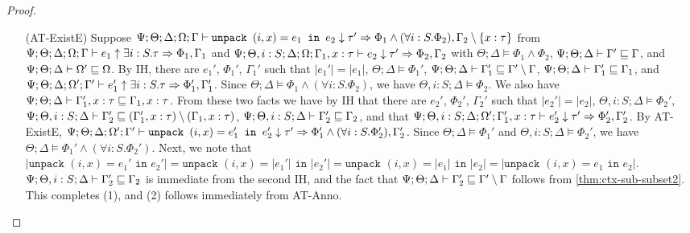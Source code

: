 \begin{proof}
\begin{itemize}
   \item[(AT-ExistE)]
   Suppose $\Psi ; \Theta ; \Delta ; \Omega ; \Gamma\vdash \texttt{unpack } (i,x) = e_1 \texttt{ in } e_2 \downarrow \tau' \Rightarrow \Phi_1 \wedge (\forall i : S. \Phi_2) , \Gamma_2 \setminus \{x : \tau\}$
   from 
   $\Psi ; \Theta ; \Delta ; \Omega ; \Gamma\vdash e_1 \uparrow \exists i : S.\tau \Rightarrow \Phi_1, \Gamma_1$
   and 
   $\Psi ; \Theta, i : S ; \Delta ; \Omega ; \Gamma_1, x : \tau \vdash e_2 \downarrow \tau' \Rightarrow \Phi_2, \Gamma_2$
   with $\Theta ; \Delta \vDash \Phi_1 \wedge \Phi_2$,
   $\Psi ; \Theta ; \Delta \vdash \Gamma' \sqsubseteq \Gamma$, and
   $\Psi ; \Theta ; \Delta \vdash \Omega' \sqsubseteq \Omega$.
   By IH, there are $e_1'$, $\Phi_1'$, $\Gamma_1'$ such that 
   $|e_1'| = |e_1|$,
   $\Theta ; \Delta \vDash \Phi_1'$,
   $\Psi ; \Theta ; \Delta \vdash \Gamma_1' \sqsubseteq \Gamma' \setminus \Gamma$,
   $\Psi ; \Theta ; \Delta \vdash \Gamma_1' \sqsubseteq \Gamma_1$, and
   $\Psi ; \Theta ; \Delta ; \Omega' ; \Gamma'\vdash e_1' \uparrow \exists i : S.\tau \Rightarrow \Phi_1', \Gamma_1'$.
   Since $\Theta ; \Delta \vDash \Phi_1 \wedge (\forall i : S. \Phi_2)$, we have $\Theta, i : S ; \Delta \vDash \Phi_2$. We also have $\Psi ; \Theta ; \Delta \vdash \Gamma_1', x : \tau \sqsubseteq \Gamma_1, x : \tau$. From these two facts we have
   by IH that there are $e_2'$, $\Phi_2'$, $\Gamma_2'$ such that
   $|e_2'| = |e_2|$,
   $\Theta, i : S ; \Delta \vDash \Phi_2'$,
   $\Psi ; \Theta, i : S ; \Delta \vdash \Gamma_2' \sqsubseteq (\Gamma_1', x : \tau) \setminus (\Gamma_1, x : \tau)$,
   $\Psi ; \Theta, i : S ; \Delta \vdash \Gamma_2' \sqsubseteq \Gamma_2$, and that
   $\Psi ; \Theta, i : S ; \Delta ; \Omega' ; \Gamma_1', x : \tau \vdash e_2' \downarrow \tau' \Rightarrow \Phi_2',\Gamma_2'$.
   By AT-ExistE, 
   $\Psi ; \Theta ; \Delta ; \Omega' ; \Gamma' \vdash \texttt{unpack } (i,x) = e_1' \texttt{ in } e_2' \downarrow \tau' \Rightarrow \Phi_1' \wedge (\forall i : S. \Phi_2'), \Gamma_2'$.
   Since $\Theta ; \Delta \vDash \Phi_1'$ and $\Theta, i : S; \Delta \vDash \Phi_2'$, we have $\Theta ; \Delta \vDash \Phi_1' \wedge (\forall i : S. \Phi_2')$.
   Next, we note that $|\texttt{unpack } (i,x) = e_1' \texttt{ in } e_2'| = \texttt{unpack } (i,x) = |e_1'| \texttt{ in } |e_2'| = \texttt{unpack } (i,x) = |e_1| \texttt{ in } |e_2| = |\texttt{unpack } (i,x) = e_1 \texttt{ in } e_2|$. $\Psi ; \Theta, i : S ; \Delta \vdash \Gamma_2' \sqsubseteq \Gamma_2$ is immediate from the second IH, and the fact that $\Psi ; \Theta ; \Delta \vdash \Gamma_2' \sqsubseteq \Gamma' \setminus \Gamma$ follows from \autoref{thm:ctx-sub-subset2}. This completes (1), and (2) follows immediately from AT-Anno.
   

\end{itemize}
\end{proof}
